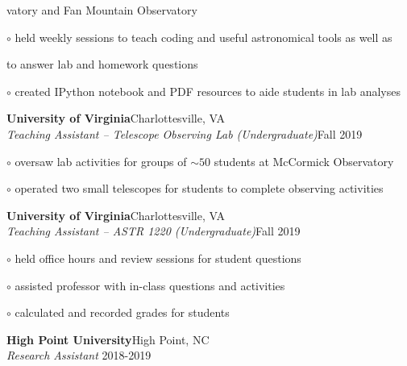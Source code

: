 \documentclass[letterpaper,12pt]{article}
\begin{document}
\begin{minipage}{6.1in}
\vspace{-0.5mm}
\hspace{0.64in} vatory and Fan Mountain Observatory

\hspace{0.5in} $\circ$ held weekly sessions to teach coding and useful astronomical tools as well as 

\vspace{-0.5mm}
\hspace{0.64in} to answer lab and homework questions

\hspace{0.5in} $\circ$ created IPython notebook and PDF resources to aide students in lab analyses

\vspace{2mm}
\textbf{University of Virginia}\hfill Charlottesville, VA\\ %
\textit{Teaching Assistant -- Telescope Observing Lab (Undergraduate)}\hfill Fall 2019

\hspace{0.5in} $\circ$ oversaw lab activities for groups of $\sim\!50$ students at McCormick Observatory

\hspace{0.5in} $\circ$ operated two small telescopes for students to complete observing activities

\vspace{2mm}
\textbf{University of Virginia}\hfill Charlottesville, VA\\ %
\textit{Teaching Assistant -- ASTR 1220 (Undergraduate)}\hfill Fall 2019

\hspace{0.5in} $\circ$ held office hours and review sessions for student questions

\hspace{0.5in} $\circ$ assisted professor with in-class questions and activities

\hspace{0.5in} $\circ$ calculated and recorded grades for students

\vspace{2mm}
\textbf{High Point University}\hfill High Point, NC\\ %
\textit{Research Assistant 
}\hfill 2018-2019


\end{minipage}
\end{document}
